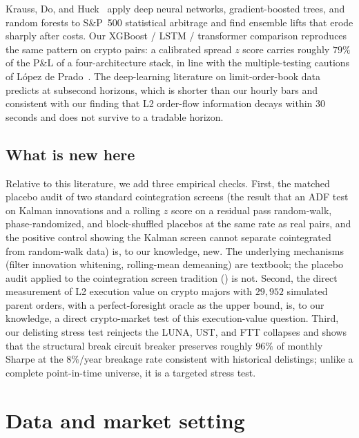 \documentclass[11pt]{article}
\begin{document}
Krauss, Do, and Huck~\cite{krauss2017deep} apply deep neural networks, gradient-boosted
trees, and random forests to S\&P~500 statistical arbitrage and find ensemble lifts that
erode sharply after costs. Our XGBoost / LSTM / transformer comparison reproduces the same
pattern on crypto pairs: a calibrated spread $z$ score carries roughly $79\%$ of the P\&L of
a four-architecture stack, in line with the multiple-testing cautions of L\'opez de
Prado~\cite{lopezdeprado2018advances}. The deep-learning literature on limit-order-book
data predicts at subsecond horizons, which is shorter than our hourly bars and consistent
with our finding that L2 order-flow information decays within $30$ seconds and does not
survive to a tradable horizon.

\subsection{What is new here}
\label{sec:related-novelty}

Relative to this literature, we add three empirical checks. First, the matched placebo audit of
two standard cointegration screens (the result that an ADF test on Kalman
innovations and a rolling $z$ score on a residual pass random-walk, phase-randomized, and
block-shuffled placebos at the same rate as real pairs, and the positive control showing
the Kalman screen cannot separate cointegrated from random-walk data) is, to our
knowledge, new. The underlying mechanisms (filter innovation whitening, rolling-mean
demeaning) are textbook; the placebo audit applied to the cointegration screen tradition
(\cite{vidyamurthy2004pairs, elliott2005pairs, triantafyllopoulos2011dynamic}) is not.
Second, the direct measurement of L2 execution value on crypto majors with $29{,}952$
simulated parent orders, with a perfect-foresight oracle as the upper bound, is, to our
knowledge, a direct crypto-market test of this execution-value question. Third, our
delisting stress test reinjects the LUNA, UST, and FTT collapses and shows that the structural
break circuit breaker preserves roughly $96\%$ of monthly Sharpe at the $8\%$/year breakage
rate consistent with historical delistings; unlike a complete point-in-time universe, it is a
targeted stress test.

\section{Data and market setting}
\label{sec:methods}
\end{document}
